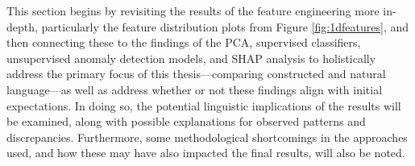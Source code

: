 \documentclass[12pt,a4paper]{article}
\numberwithin{figure}{section}
\numberwithin{table}{section}
\numberwithin{definition}{section}
\begin{document}


This section begins by revisiting the results of the feature engineering more in-depth, particularly the feature distribution plots from Figure \ref{fig:1dfeatures}, and then connecting these to the findings of the PCA, supervised classifiers, unsupervised anomaly detection models, and SHAP analysis to holistically address the primary focus of this thesis---comparing constructed and natural language---as well as address whether or not these findings align with initial expectations. In doing so, the potential linguistic implications of the results will be examined, along with possible explanations for observed patterns and discrepancies. Furthermore, some methodological shortcomings in the approaches used, and how these may have also impacted the final results, will also be noted.
\end{document}
